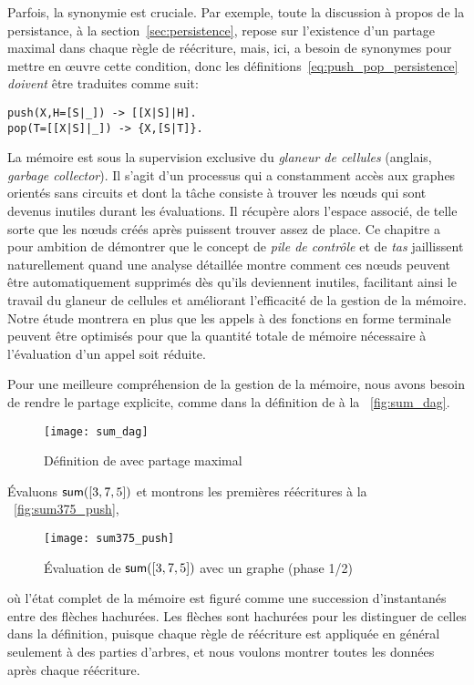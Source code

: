 Parfois, la synonymie est cruciale. Par exemple, toute la discussion à
propos de la persistance, à la section~\ref{sec:persistence}, repose
sur l'existence d'un partage maximal dans chaque règle de réécriture,
mais, ici, \Erlang a besoin de synonymes pour mettre en {\oe}uvre
cette condition, donc les définitions~\eqref{eq:push_pop_persistence}
 \emph{doivent} être traduites comme
suit:
\begin{verbatim}
push(X,H=[S|_]) -> [[X|S]|H].
pop(T=[[X|S]|_]) -> {X,[S|T]}.
\end{verbatim}


La mémoire est sous la supervision exclusive du
\emph{glaneur de cellules} (anglais, \emph{garbage collector}). Il
s'agit d'un processus qui a constamment accès aux graphes orientés
sans circuits et dont la tâche consiste à trouver les n{\oe}uds qui
sont devenus inutiles durant les évaluations. Il récupère alors
l'espace associé, de telle sorte que les n{\oe}uds créés après
puissent trouver assez de place. Ce chapitre a pour ambition de
démontrer que le concept de \emph{pile de contrôle} et de \emph{tas}
jaillissent naturellement quand une analyse détaillée montre comment
ces n{\oe}uds peuvent être automatiquement supprimés dès qu'ils
deviennent inutiles, facilitant ainsi le travail du glaneur de
cellules et améliorant l'efficacité de la gestion de la mémoire. Notre
étude montrera en plus que les appels à des fonctions en forme
terminale peuvent être optimisés pour que la quantité totale de mémoire nécessaire à
l'évaluation d'un appel soit réduite.

Pour une meilleure compréhension de la gestion de la mémoire, nous
avons besoin de rendre le partage explicite, comme dans la définition
de  à la \fig~\vref{fig:sum_dag}.
\begin{figure}
\centering
\texttt{[image: sum\_dag]}%
\caption{Définition de  avec partage maximal}
\label{fig:sum_dag}
\end{figure}
Évaluons \(\textsf{sum}([3,7,5])\) et montrons les premières réécritures
à la \fig~\vref{fig:sum375_push},
\begin{figure}[b]
\centering
\texttt{[image: sum375\_push]}
\caption{Évaluation de \(\textsf{sum}([3,7,5])\) avec un graphe (phase 1/2)}
\label{fig:sum375_push}
\end{figure}
où l'état complet de la mémoire est figuré comme une succession
d'instantanés entre des flèches hachurées.  Les flèches sont hachurées pour les distinguer de celles
dans la définition, puisque chaque règle de réécriture est appliquée
en général seulement à des parties d'arbres, et nous voulons montrer
toutes les données après chaque réécriture.

